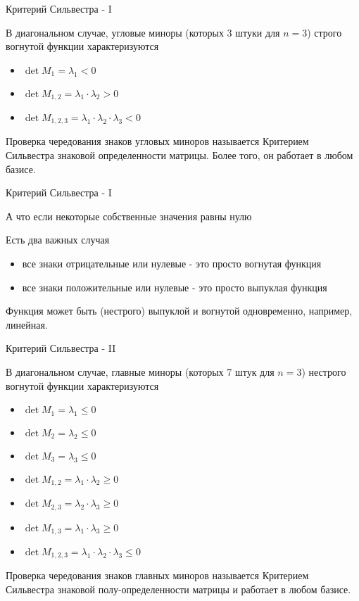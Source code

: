 \documentclass{beamer}
\begin{document}
\begin{frame}{Критерий Сильвестра - I}

В диагональном случае, угловые миноры (которых 3 штуки для $n = 3$) строго вогнутой функции характеризуются

\begin{itemize}
  \item $\det M_{1} = \lambda_1 < 0$
  \item $\det M_{1,2} = \lambda_1 \cdot \lambda_2 > 0$
  \item $\det M_{1,2,3} = \lambda_1 \cdot \lambda_2 \cdot \lambda_3 < 0$
\end{itemize}

Проверка чередования знаков угловых миноров называется \alert{Критерием Сильвестра знаковой определенности матрицы}. Более того, он работает в любом базисе.

\end{frame}

\begin{frame}{Критерий Сильвестра - I}

А что если некоторые собственные значения равны нулю

Есть два важных случая

\begin{itemize}
  \item все знаки отрицательные или нулевые - это просто \alert{вогнутая} функция
  \item все знаки положительные или нулевые - это просто \alert{выпуклая} функция
\end{itemize}

Функция может быть (нестрого) выпуклой и вогнутой одновременно, например, линейная.

\end{frame}

\begin{frame}{Критерий Сильвестра - II}

В диагональном случае, главные миноры (которых 7 штук для $n = 3$) нестрого вогнутой функции характеризуются

\begin{itemize}
  \item $\det M_{1} = \lambda_1 \leqslant 0$
  \item $\det M_{2} = \lambda_2 \leqslant 0$
  \item $\det M_{3} = \lambda_3 \leqslant 0$
  \item $\det M_{1,2} = \lambda_1 \cdot \lambda_2 \geqslant 0$
  \item $\det M_{2,3} = \lambda_2 \cdot \lambda_3 \geqslant 0$
  \item $\det M_{1,3} = \lambda_1 \cdot \lambda_3 \geqslant 0$
  \item $\det M_{1,2,3} = \lambda_1 \cdot \lambda_2 \cdot \lambda_3 \leqslant 0$
\end{itemize}

Проверка чередования знаков главных миноров называется \alert{Критерием Сильвестра знаковой полу-определенности матрицы} и работает в любом базисе.

\end{frame}
\end{document}
